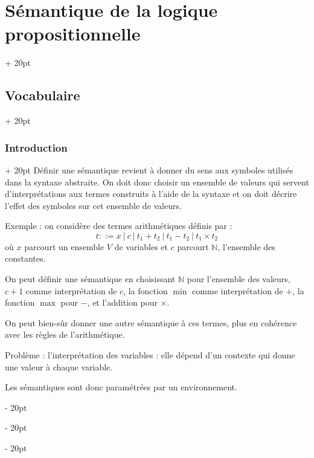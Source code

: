 \documentclass[a4paper, 12pt, twoside]{article}
\newcommand{\N}{\mathbb{N}} %
\newcommand{\ind}[1][20pt]{\advance\leftskip + #1}
\newcommand{\deind}[1][20pt]{\advance\leftskip - #1}
\newenvironment{indt}[2][20pt]{#2 \par \ind[#1]}{\par \deind} %
\begin{document}
    \begin{indt}{\section{Sémantique de la logique propositionnelle}}
        
        \begin{indt}{\subsection{Vocabulaire}}
            \begin{indt}{\subsubsection{Introduction}}
                Définir une sémantique revient à donner du sens aux symboles utilisés dans la syntaxe abstraite. On doit donc choisir un ensemble de valeurs qui servent d'interprétations aux termes construits à l'aide de la syntaxe et on doit décrire l'effet des symboles sur cet ensemble de valeurs.
                
                \vspace{12pt}
                
                Exemple : on considère des termes arithmétiques définis par :
                    \[ t ::= x\ |\ c\ |\ t_1 + t_2\ |\ t_1 - t_2\ |\ t_1 \times t_2 \]
                où $x$ parcourt un ensemble $V$ de variables et $c$ parcourt $\N$, l'ensemble des constantes.
                
                On peut définir une sémantique en choisissant $\N$ pour l'ensemble des valeurs, $c + 1$ comme interprétation de $c$, la fonction $\min$ comme interprétation de $+$, la fonction $\max$ pour $-$, et l'addition pour $\times$.
                
                On peut bien-sûr donner une autre sémantique à ces termes, plus en cohérence avec les règles de l'arithmétique.
                
                Problème : l'interprétation des variables : elle dépend d'un contexte qui donne une valeur à chaque variable.
                
                Les sémantiques sont donc paramétrées par un environnement.
            \end{indt}
            
            \vspace{12pt}
            

\end{indt}
\end{indt}
\end{document}
